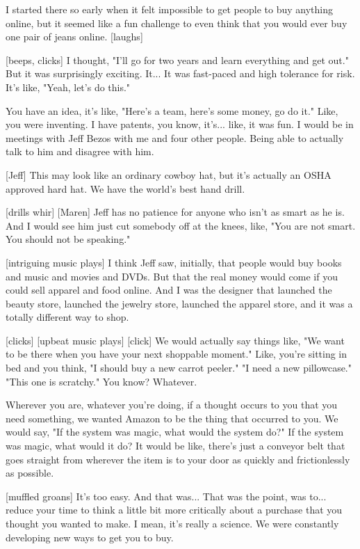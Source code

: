 \documentclass[a4paper]{article}
\begin{document}
	
	I started there so early when it felt impossible to get people to buy anything online, but it seemed like a fun challenge to even think that you would ever buy one pair of jeans online. [laughs]
	
	
	[beeps, clicks]
	I thought, "I'll go for two years and learn everything and get out." But it was surprisingly exciting.
	It... It was fast-paced and high tolerance for risk. It's like, "Yeah, let's do this."


	You have an idea, it's like, "Here's a team, here's some money, go do it."
	Like, you were inventing. I have patents, you know, it's... like, it was fun.
	I would be in meetings with Jeff Bezos with me and four other people.
	Being able to actually talk to him and disagree with him.


	[Jeff] This may look like an ordinary cowboy hat, but it's actually an OSHA approved hard hat.
	We have the world's best hand drill.
	
	
	
	[drills whir]
	[Maren] Jeff has no patience for anyone who isn't as smart as he is.
	And I would see him just cut somebody off at the knees, like, "You are not smart. You should not be speaking."
	
	
	
	[intriguing music plays]
	I think Jeff saw, initially, that people would buy books and music and movies and DVDs.
	But that the real money would come if you could sell apparel and food online.
	And I was the designer that launched the beauty store, launched the jewelry store, launched the apparel store, and it was a totally different way to shop.
	
	
	[clicks]
	[upbeat music plays]
	[click]
	We would actually say things like, "We want to be there when you have your next shoppable moment."
	Like, you're sitting in bed and you think, "I should buy a new carrot peeler."
	"I need a new pillowcase."
	"This one is scratchy." You know? Whatever.
	
	Wherever you are, whatever you're doing, if a thought occurs to you that you need something, we wanted Amazon to be the thing that occurred to you.
	We would say, "If the system was magic, what would the system do?"
	If the system was magic, what would it do? It would be like, there's just a conveyor belt that goes straight from wherever the item is to your door as quickly and frictionlessly as possible.
	
	
	[muffled groans]
	It's too easy. And that was... That was the point, was to... reduce your time to think a little bit more critically about a purchase that you thought you wanted to make.
	I mean, it's really a science.
	We were constantly developing new ways to get you to buy.
	
\end{document}
